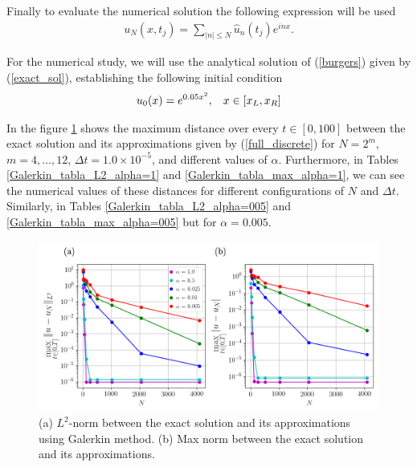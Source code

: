 		Finally to evaluate the numerical solution the following expression will be used
		\begin{align*}
			u_N(x, t_j) = \displaystyle \sum_{|n| \leq N} \hat{u}_n (t_j) e^{inx}.
		\end{align*}
		
		For the numerical study, we will use the analytical solution of (\ref {burgers}) given by (\ref{exact_sol}), establishing the following initial condition
		\begin{align}
			\label{IC}
			u_0 (x) = e^{0.05 x^2}, \hspace{3mm} x \in [x_L, x_R] 
		\end{align}
		
		In the figure \ref{Galerkin_alphas} shows the maximum distance over every $t \in [0, 100]$ between the exact solution and its approximations given by (\ref{full_discrete}) for $N = 2^m$, $m = 4, \dots, 12$, $\Delta t = 1.0 \times 10^{-5}$, and different values of $\alpha$. Furthermore, in Tables \ref{Galerkin_tabla_L2_alpha=1} and \ref{Galerkin_tabla_max_alpha=1}, we can see the numerical values ​​of these distances for different configurations of $N$ and $\Delta t$. Similarly, in Tables \ref{Galerkin_tabla_L2_alpha=005} and \ref{Galerkin_tabla_max_alpha=005} but for $\alpha = 0.005$.
	
	\begin{figure}[H]
		\centering
		\includegraphics[width=15cm]{Figures/Galerkin/Graphics/alphas_Error_N.png}
		\caption{(a) $L^2$-norm between the exact solution and its approximations using Galerkin method. (b) Max norm between the exact solution and its approximations.}
		\label{Galerkin_alphas}
	\end{figure}

